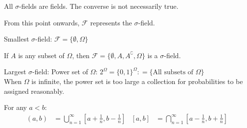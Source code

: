 \documentclass{huhtakm-template-book-v2}
\begin{document}
    \begin{rem}
        All $\sigma$-fields are fields. The converse is not necessarily true.
    \end{rem}
    \begin{rem}
        From this point onwards, $\mathcal{F}$ represents the $\sigma$-field.
    \end{rem}
    \begin{eg}
        Smallest $\sigma$-field: $\mathcal{F} = \{\emptyset,\Omega\}$
    \end{eg}
    \begin{eg}
        If $A$ is any subset of $\Omega$, then $\mathcal{F} = \{\emptyset,A,A^{\complement},\Omega\}$ is a $\sigma$-field.
    \end{eg}
    \begin{eg}
        Largest $\sigma$-field: Power set of $\Omega$: $2^{\Omega} = \{0,1\}^{\Omega}: = \{\text{All subsets of }\Omega\}$\\
        When $\Omega$ is infinite, the power set is too large a collection for probabilities to be assigned reasonably.
    \end{eg}
    \begin{rem}
        For any $a < b$:
        \begin{align*}
            (a, b) &= \bigcup_{n = 1}^{\infty}\left[a+\frac{1}{n},b-\frac{1}{n}\right] &            [a, b] &= \bigcap_{n = 1}^{\infty}\left[a-\frac{1}{n},b+\frac{1}{n}\right]
        \end{align*}
    \end{rem}
    \newpage
\end{document}
